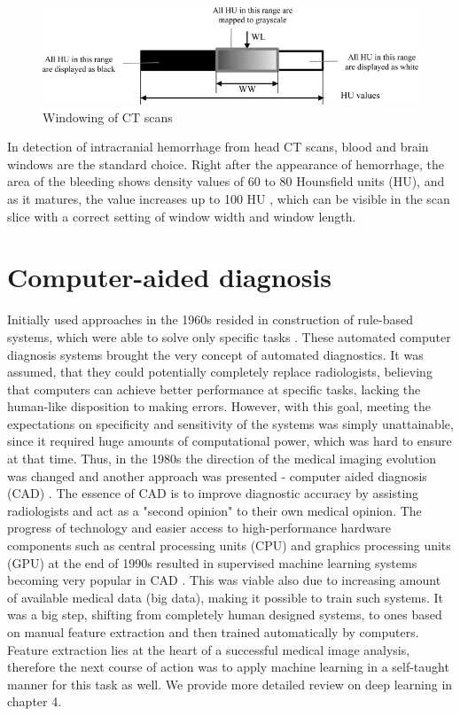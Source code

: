 \begin{figure}[h]
\begin{centering}
\includegraphics[width=15cm]{assets/images/windowingHU}
\par\end{centering}
\caption{Windowing of CT scans
\label{fig:windowing} }
\end{figure}

In detection of intracranial hemorrhage from head CT scans, blood and brain windows are the standard choice. Right after the appearance of hemorrhage, the area of the bleeding shows density values of 60 to 80 Hounsfield units (HU), and as it matures, the value increases up to 100 HU  \cite{principlesOfCT}, which can be visible in the scan slice with a correct setting of window width and window length.

\section{Computer-aided diagnosis}
Initially used approaches in the 1960s resided in construction of rule-based systems, which were able to solve only specific tasks \cite{surveyOnImageing}. These automated computer diagnosis systems brought the very concept of automated diagnostics. It was assumed, that they could potentially completely replace radiologists, believing that computers can achieve better performance at specific tasks, lacking the human-like disposition to making errors. However, with this goal, meeting the expectations on specificity and sensitivity of the systems was simply unattainable, since it required huge amounts of computational power, which was hard to ensure at that time. Thus, in the 1980s the direction of the medical imaging evolution was changed and another approach was presented - computer aided diagnosis (CAD) \cite{diagnostic50years}. The essence of CAD is to improve diagnostic accuracy by assisting radiologists and act as a "second opinion" \cite{surveyOnImageing, CADinmedicalImaging} to their own medical opinion. 
The progress of technology and easier access to high-performance hardware components such as central processing units (CPU) and graphics processing units (GPU) at the end of 1990s resulted in supervised machine learning systems becoming very popular in CAD \cite{surveyOnImageing}. This was viable also due to increasing amount of available medical data (big data), making it possible to train such systems. It was a big step, shifting from completely human designed systems, to ones based on manual feature extraction and then trained automatically by computers. Feature extraction lies at the heart of a successful medical image analysis, therefore the next course of action was to apply machine learning in a self-taught manner for this task as well. We provide more detailed review on deep learning in chapter 4.

